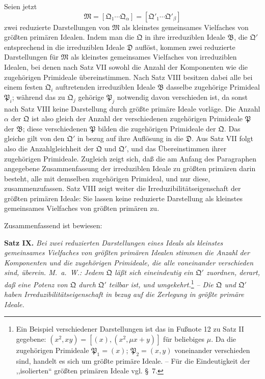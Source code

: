 \documentclass[11pt]{article}
\newcommand{\ideal}[1]{\mathfrak{#1}}
\begin{document}
Seien jetzt
\[
 \ideal M=[\ideal Q_1\cdots\ideal Q_\alpha]=[\ideal Q'_1\cdots\ideal Q'_\beta]
\]
zwei reduzierte Darstellungen von $\ideal M$ als kleinstes gemeinsames Vielfaches von größten primären Idealen. Indem man die $\ideal Q$ in ihre irreduziblen Ideale $\ideal B$, die $\ideal Q'$ entsprechend in die irreduziblen Ideale $\ideal D$ auflöst, kommen zwei reduzierte Darstellungen für $\ideal M$ als kleinstes gemeinsames Vielfaches von irreduziblen Idealen, bei denen nach Satz VII sowohl die Anzahl der Komponenten wie die zugehörigen Primideale übereinstimmen. Nach Satz VIII besitzen dabei alle bei einem festen $\ideal Q_i$ auftretenden irreduziblen Ideale $\ideal B$ dasselbe zugehörige Primideal $\ideal P_i$; während das zu $\ideal Q_j$ gehörige $\ideal P_j$ notwendig davon verschieden ist, da sonst nach Satz VIII keine Darstellung durch größte primäre Ideale vorläge. Die Anzahl $\alpha$ der $\ideal Q$ ist also gleich der Anzahl der verschiedenen zugehörigen Primideale $\ideal P$ der $\ideal B$; diese verschiedenen $\ideal P$ bilden die zugehörigen Primideale der $\ideal Q$. Das gleiche gilt von den $\ideal Q'$ in bezug auf ihre Auflösung in die $\ideal D$. Aus Satz VII folgt also die Anzahlgleichheit der $\ideal Q$ und $\ideal Q'$, und das Übereinstimmen ihrer zugehörigen Primideale. Zugleich zeigt sich, daß die am Anfang des Paragraphen angegebene Zusammenfassung der irreduziblen Ideale zu größten primären darin besteht, alle mit demselben zugehörigen Primideal, und nur diese, zusammenzufassen. Satz VIII zeigt weiter die Irreduzibilitätseigenschaft der größten primären Ideale: Sie lassen keine reduzierte Darstellung als kleinstes gemeinsames Vielfaches von größten primären zu.

Zusammenfassend ist bewiesen:

\textbf{Satz IX.} \emph{Bei zwei reduzierten Darstellungen eines Ideals als kleinstes gemeinsames Vielfaches von größten primären Idealen stimmen die Anzahl der Komponenten und die zugehörigen Primideale, die alle voneinander verschieden sind, überein. M.~a.~W.: Jedem $\ideal Q$ läßt sich eineindeutig ein $\ideal Q'$ zuordnen, derart, daß eine Potenz von $\ideal Q$ durch $\ideal Q'$ teilbar ist, und umgekehrt.}\footnote{Ein Beispiel verschiedener Darstellungen ist das in Fußnote 12 zu Satz II gegebene: $(x^2,xy)=[(x),(x^2,\mu x+y)]$ für beliebiges $\mu$. Da die zugehörigen Primideale $\ideal P_1=(x)$; $\ideal P_2=(x,y)$ voneinander verschieden sind, handelt es sich um größte primäre Ideale. -- Für die Eindeutigkeit der ,,isolierten`` größten primären Ideale vgl. \S~7.} \emph{-- Die $\ideal Q$ und $\ideal Q'$ haben Irreduzibilitätseigenschaft in bezug auf die Zerlegung in größte primäre Ideale.}
\end{document}
